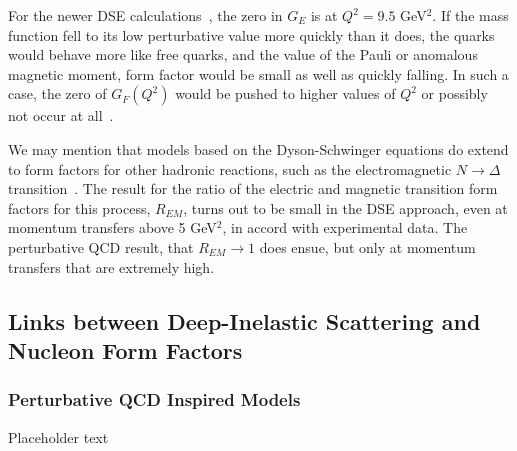 For the newer DSE calculations~\cite{Segovia:2014aza}, the zero in $G_E$ is at $Q^2 = 9.5$ GeV$^2$.  If the mass function fell to its low perturbative value more quickly than it does, the quarks would behave more like free quarks, and the value of the Pauli or anomalous magnetic moment, form factor would be small as well as quickly falling.  In such a case, the zero of $G_F(Q^2)$ would be pushed to higher values of $Q^2$ or possibly not occur at all~\cite{Segovia:2014aza}.


We may mention that models based on the Dyson-Schwinger equations do extend to  form factors for other hadronic reactions, such as the electromagnetic $N \to \Delta$ transition~\cite{Segovia:2013uga,Segovia:2014aza}.  The result for the ratio of the electric and magnetic transition form factors for this process, $R_{EM}$, turns out to be small in the DSE approach,  even at momentum transfers above 5 GeV$^2$,  in accord with experimental data.   The perturbative QCD result, that $R_{EM} \to 1$ does ensue, but only at momentum transfers that are extremely high.  %




\subsection{Links between Deep-Inelastic Scattering and Nucleon Form Factors}
\label{subsec:dis}

%

\subsubsection{Perturbative QCD Inspired Models}
\label{subsubsec:pqcd}


Placeholder text


